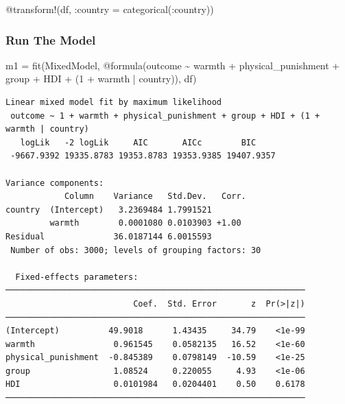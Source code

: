\documentclass[
  letterpaper,
  DIV=11,
  numbers=noendperiod]{scrreprt}
\newenvironment{Shaded}{\begin{snugshade}}{\end{snugshade}}
\newcommand{\FloatTok}[1]{\textcolor[rgb]{0.68,0.00,0.00}{#1}}
\newcommand{\FunctionTok}[1]{\textcolor[rgb]{0.28,0.35,0.67}{#1}}
\newcommand{\NormalTok}[1]{\textcolor[rgb]{0.00,0.23,0.31}{#1}}
\newcommand{\OperatorTok}[1]{\textcolor[rgb]{0.37,0.37,0.37}{#1}}
\newcommand{\PreprocessorTok}[1]{\textcolor[rgb]{0.68,0.00,0.00}{#1}}
\begin{document}
\begin{Shaded}
\begin{Highlighting}[]
\PreprocessorTok{@transform}\NormalTok{!(df, }\OperatorTok{:}\NormalTok{country }\OperatorTok{=} \FunctionTok{categorical}\NormalTok{(}\OperatorTok{:}\NormalTok{country))}
\end{Highlighting}
\end{Shaded}

\hypertarget{run-the-model-2}{%
\subsubsection{Run The Model}\label{run-the-model-2}}

\begin{Shaded}
\begin{Highlighting}[]

\NormalTok{m1 }\OperatorTok{=} \FunctionTok{fit}\NormalTok{(MixedModel, }\PreprocessorTok{@formula}\NormalTok{(outcome }\OperatorTok{\textasciitilde{}}\NormalTok{ warmth }\OperatorTok{+}\NormalTok{ physical\_punishment }\OperatorTok{+} 
\NormalTok{               group }\OperatorTok{+}\NormalTok{ HDI }\OperatorTok{+}
\NormalTok{               (}\FloatTok{1} \OperatorTok{+}\NormalTok{ warmth }\OperatorTok{|}\NormalTok{ country)), df)}
\end{Highlighting}
\end{Shaded}

\begin{verbatim}
Linear mixed model fit by maximum likelihood
 outcome ~ 1 + warmth + physical_punishment + group + HDI + (1 + warmth | country)
   logLik   -2 logLik     AIC       AICc        BIC    
 -9667.9392 19335.8783 19353.8783 19353.9385 19407.9357

Variance components:
            Column    Variance   Std.Dev.   Corr.
country  (Intercept)   3.2369484 1.7991521
         warmth        0.0001080 0.0103903 +1.00
Residual              36.0187144 6.0015593
 Number of obs: 3000; levels of grouping factors: 30

  Fixed-effects parameters:
─────────────────────────────────────────────────────────────
                          Coef.  Std. Error       z  Pr(>|z|)
─────────────────────────────────────────────────────────────
(Intercept)          49.9018      1.43435     34.79    <1e-99
warmth                0.961545    0.0582135   16.52    <1e-60
physical_punishment  -0.845389    0.0798149  -10.59    <1e-25
group                 1.08524     0.220055     4.93    <1e-06
HDI                   0.0101984   0.0204401    0.50    0.6178
─────────────────────────────────────────────────────────────
\end{verbatim}
\end{document}
